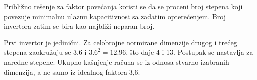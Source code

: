 Približno rešenje za faktor povećanja koristi se da se proceni broj stepena koji povezuje minimalnu ulaznu kapacitivnost sa zadatim opterećenjem. Broj invertora zatim se bira kao najbliži neparan broj.

Prvi invertor je jedinični. Za celobrojne normirane dimenzije drugog i trećeg stepena zaokružuju se $3.6$ i $3.6^2=12.96$, što daje 4 i 13. Postupak se nastavlja za naredne stepene. Ukupno kašnjenje računa se iz odnosa stvarno izabranih dimenzija, a ne samo iz idealnog faktora 3,6.
